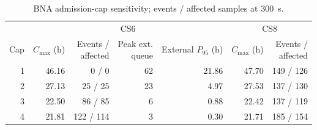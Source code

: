 \begin{table}[tbp]
\caption{BNA admission-cap sensitivity; events / affected samples at 300~s.\label{tab:admission}}
\centering
\footnotesize
\setlength{\tabcolsep}{3pt}
\begin{tabular*}{\textwidth}{@{\extracolsep{\fill}}rrrrrrr@{}}
\toprule
 & \multicolumn{4}{c}{CS6} & \multicolumn{2}{c}{CS8}\\\cmidrule(lr){2-5}\cmidrule(lr){6-7} Cap & \shortstack{$C_{\max}$\\(h)} & \shortstack{Events /\\affected} & \shortstack{Peak ext.\\queue} & \shortstack{External\\$P_{95}$ (h)} & \shortstack{$C_{\max}$\\(h)} & \shortstack{Events /\\affected}\\
\midrule
1 & 46.16 & 0 / 0 & 62 & 21.86 & 47.70 & 149 / 126\\
2 & 27.13 & 25 / 25 & 23 & 4.97 & 27.53 & 137 / 130\\
3 & 22.50 & 86 / 85 & 6 & 0.88 & 22.42 & 137 / 119\\
4 & 21.81 & 122 / 114 & 3 & 0.30 & 21.71 & 185 / 154\\
\bottomrule
\end{tabular*}
\end{table}
